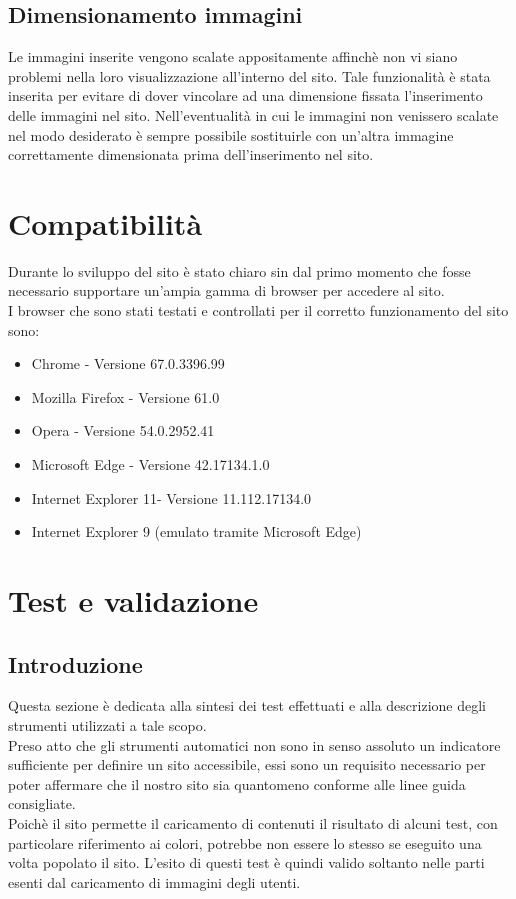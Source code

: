 \documentclass[a4paper,12pt]{article}
\begin{document}
\subsection{Dimensionamento immagini}
Le immagini inserite vengono scalate appositamente affinchè non vi siano problemi nella loro visualizzazione all'interno del sito. Tale funzionalità è stata inserita per evitare di dover vincolare ad una dimensione fissata l'inserimento delle immagini nel sito. Nell'eventualità in cui le immagini non venissero scalate nel modo desiderato è sempre possibile sostituirle con un'altra immagine correttamente dimensionata prima dell'inserimento nel sito.

\section{Compatibilità}
Durante lo sviluppo del sito è stato chiaro sin dal primo momento che fosse necessario supportare un'ampia gamma di browser per accedere al sito.
\\I browser che sono stati testati e controllati per il corretto funzionamento del sito sono:
\begin{itemize}
	\item Chrome - Versione 67.0.3396.99 
	\item Mozilla Firefox - Versione 61.0
	\item Opera - Versione 54.0.2952.41
	\item Microsoft Edge - Versione 42.17134.1.0
	\item Internet Explorer 11- Versione 11.112.17134.0
	\item Internet Explorer 9 (emulato tramite Microsoft Edge)
\end{itemize}

\section{Test e validazione}
\subsection{Introduzione}
Questa sezione è dedicata alla sintesi dei test effettuati e alla descrizione degli strumenti utilizzati a tale scopo.\\
Preso atto che gli strumenti automatici non sono in senso assoluto un indicatore sufficiente per definire un sito accessibile, essi sono un requisito necessario per poter affermare che il nostro sito sia quantomeno conforme alle linee guida consigliate.\\
Poichè il sito permette il caricamento di contenuti il risultato di alcuni test, con particolare riferimento ai colori, potrebbe non essere lo stesso se eseguito una volta popolato il sito. L'esito di questi test è quindi valido soltanto nelle parti esenti dal caricamento di immagini degli utenti.
\end{document}
